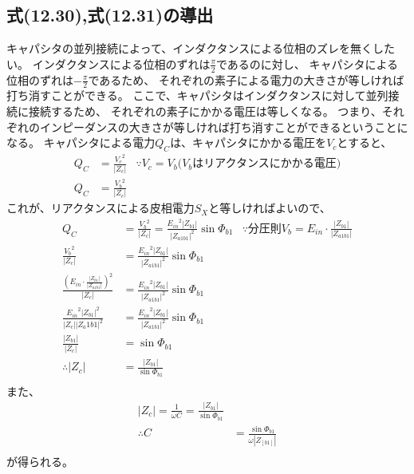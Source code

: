 \documentclass[fleqn,11pt,a4paper,dvipdfmx]{jsarticle}
\numberwithin{equation}{section}
\begin{document}
\subsection*{式(12.30),式(12.31)の導出}
キャパシタの並列接続によって、インダクタンスによる位相のズレを無くしたい。
インダクタンスによる位相のずれは$\frac{\pi}{2}$であるのに対し、
キャパシタによる位相のずれは$-\frac{\pi}{2}$であるため、
それぞれの素子による電力の大きさが等しければ打ち消すことができる。
ここで、キャパシタはインダクタンスに対して並列接続に接続するため、
それぞれの素子にかかる電圧は等しくなる。
つまり、それぞれのインピーダンスの大きさが等しければ打ち消すことができるということになる。
キャパシタによる電力$Q_C$は、キャパシタにかかる電圧を$V_c$とすると、
\begin{align*}
  Q_C &= \frac{{V_c}^2}{\left|Z_c\right|} &\because \text{$V_c = V_b$($V_b$はリアクタンスにかかる電圧)} \\
  Q_C &= \frac{{V_b}^2}{\left|Z_c\right|}
\end{align*}
これが、リアクタンスによる皮相電力$S_X$と等しければよいので、
\begin{align*}
  Q_C &= \frac{{V_b}^2}{\left|Z_c\right|} = \frac{{E_{in}}^2 \left|Z_{b1}\right|}{{\left|Z_{a1b1}\right|}^2}\sin\Phi_{b1} 
  &\because \text{分圧則} V_b = E_{in} \cdot \frac{\left|Z_{b1}\right|}{\left|Z_{a1b1}\right|}\\
  \frac{{V_b}^2}{\left|Z_c\right|} &= \frac{{E_{in}}^2 \left|Z_{b1}\right|}{{\left|Z_{a1b1}\right|}^2}\sin\Phi_{b1}\\
  \frac{{\left(E_{in} \cdot \frac{\left|Z_{b1}\right|}{\left|Z_{a1b1}\right|}\right)}^2}{\left|Z_c\right|} &= \frac{{E_{in}}^2 \left|Z_{b1}\right|}{{\left|Z_{a1b1}\right|}^2}\sin\Phi_{b1}\\
  \frac{{E_{in}}^2 {\left|Z_{b1}\right|}^2}{\left|Z_c\right| {\left|Z_a1b1\right|}^2} &= \frac{{E_{in}}^2 \left|Z_{b1}\right|}{{\left|Z_{a1b1}\right|}^2}\sin\Phi_{b1}\\
  \frac{\left|Z_{b1}\right|}{\left|Z_c\right|} &= \sin \Phi_{b1} \\
  \therefore \left|Z_c\right| &= \frac{\left|Z_{b1}\right|}{\sin \Phi_{b1}}\\
\end{align*}
また、
\begin{align*}
  \left|Z_c\right| = \frac{1}{\omega C} = \frac{\left|Z_{b1}\right|}{\sin \Phi_{b1}}\\
  \therefore C &= \frac{ \sin \Phi_{b1}}{\omega \left|Z_[b1]\right|}\\
\end{align*}
が得られる。
\end{document}
